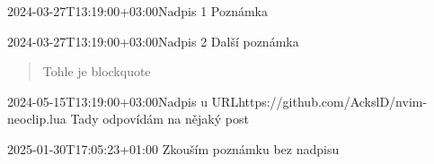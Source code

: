\documentclass{article}
\begin{document}
\begin{note}{2024-03-27T13:19:00+03:00}{Nadpis 1}
  Poznámka
\end{note}

\begin{note}{2024-03-27T13:19:00+03:00}{Nadpis 2}
  Další poznámka
  \begin{quote}
    Tohle je blockquote
  \end{quote}
\end{note}

\begin{reply}{2024-05-15T13:19:00+03:00}{Nadpis u URL}{https://github.com/AckslD/nvim-neoclip.lua}
   Tady odpovídám na nějaký post
\end{reply}

\begin{note}{2025-01-30T17:05:23+01:00}{}
Zkouším poznámku bez nadpisu

\end{note}

\end{document}
